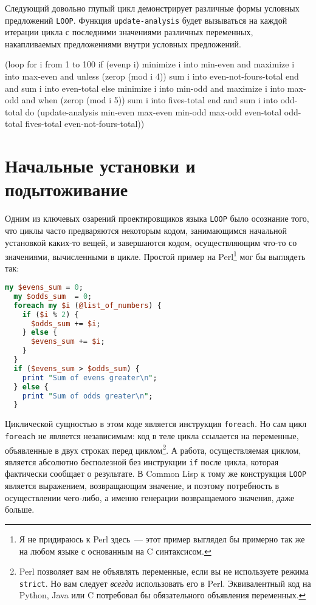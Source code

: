 Следующий довольно глупый цикл демонстрирует различные формы условных предложений
\lstinline{LOOP}. Функция \lstinline{update-analysis} будет вызываться на каждой итерации цикла с
последними значениями различных переменных, накапливаемых пред\-ло\-же\-ния\-ми внутри условных
предложений.

\begin{myverb}
(loop for i from 1 to 100
      if (evenp i)
        minimize i into min-even and 
        maximize i into max-even and
        unless (zerop (mod i 4))
          sum i into even-not-fours-total
        end
        and sum i into even-total
      else
        minimize i into min-odd and
        maximize i into max-odd and
        when (zerop (mod i 5)) 
          sum i into fives-total
        end
        and sum i into odd-total
      do (update-analysis min-even
                          max-even
                          min-odd
                          max-odd
                          even-total
                          odd-total
                          fives-total
                          even-not-fours-total))
\end{myverb}

\section{Начальные установки и подытоживание}

Одним из ключевых озарений проектировщиков языка \lstinline{LOOP} было осознание того, что
циклы часто предваряются некоторым кодом, занимающимся начальной установкой каких-то
вещей, и завершаются кодом, осуществляющим что-то со значениями, вычисленными в
цикле. Простой пример на Perl\footnote{Я не придираюсь к Perl здесь~--- этот пример
  выглядел бы примерно так же на любом языке с основанным на C синтаксисом.} мог бы
выглядеть так:

\begin{lstlisting}[language=Perl]
my $evens_sum = 0;
  my $odds_sum  = 0;
  foreach my $i (@list_of_numbers) {
    if ($i % 2) {
      $odds_sum += $i;
    } else {
      $evens_sum += $i;
    }
  }
  if ($evens_sum > $odds_sum) {
    print "Sum of evens greater\n";
  } else {
    print "Sum of odds greater\n";
  }
\end{lstlisting}

Циклической сущностью в этом коде является инструкция \lstinline{foreach}. Но сам цикл
\lstinline{foreach} не является независимым: код в теле цикла ссылается на переменные,
объявленные в двух строках перед циклом\footnote{Perl позволяет вам не объявлять
  переменные, если вы не используете режима \lstinline{strict}. Но вам следует \textit{всегда}
  использовать его в Perl. Эквивалентный код на Python, Java или C потребовал бы
  обязательного объявления переменных.}. А работа, осуществляемая циклом, является
абсолютно бесполезной без инструкции \lstinline{if} после цикла, которая фактически сообщает о
результате. В Common Lisp к тому же конструкция \lstinline{LOOP} является выражением,
возвращающим значение, и поэтому потребность в осуществлении чего-либо, а именно генерации
возвращаемого значения, даже больше.

